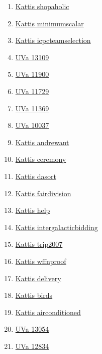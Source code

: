 \begin{enumerate}
\item \href{https://open.kattis.com/problems/shopaholic}{Kattis shopaholic}
\item \href{https://open.kattis.com/problems/minimumscalar}{Kattis minimumscalar}
\item \href{https://open.kattis.com/problems/icpcteamselection}{Kattis icpcteamselection}
\item \href{https://onlinejudge.org/index.php?option=com_onlinejudge&Itemid=8&page=show_problem&problem=5020}{UVa 13109}
\item \href{https://onlinejudge.org/index.php?option=com_onlinejudge&Itemid=8&page=show_problem&problem=3051}{UVa 11900}
\item \href{https://onlinejudge.org/index.php?option=com_onlinejudge&Itemid=8&page=show_problem&problem=2829}{UVa 11729}
\item \href{https://onlinejudge.org/index.php?option=com_onlinejudge&Itemid=8&page=show_problem&problem=2354}{UVa 11369}
\item \href{https://onlinejudge.org/index.php?option=com_onlinejudge&Itemid=8&page=show_problem&problem=978}{UVa 10037}
\item \href{https://open.kattis.com/problems/andrewant}{Kattis andrewant}
\item \href{https://open.kattis.com/problems/ceremony}{Kattis ceremony}
\item \href{https://open.kattis.com/problems/dasort}{Kattis dasort}
\item \href{https://open.kattis.com/problems/fairdivision}{Kattis fairdivision}
\item \href{https://open.kattis.com/problems/help}{Kattis help}
\item \href{https://open.kattis.com/problems/intergalacticbidding}{Kattis intergalacticbidding}
\item \href{https://open.kattis.com/problems/trip2007}{Kattis trip2007}
\item \href{https://open.kattis.com/problems/wffnproof}{Kattis wffnproof}
\item \href{https://open.kattis.com/problems/delivery}{Kattis delivery}
\item \href{https://open.kattis.com/problems/birds}{Kattis birds}
\item \href{https://open.kattis.com/problems/airconditioned}{Kattis airconditioned}
\item \href{https://onlinejudge.org/index.php?option=com_onlinejudge&Itemid=8&page=show_problem&problem=4952}{UVa 13054}
\item \href{https://onlinejudge.org/index.php?option=com_onlinejudge&Itemid=8&page=show_problem&problem=4699}{UVa 12834}

\end{enumerate}
